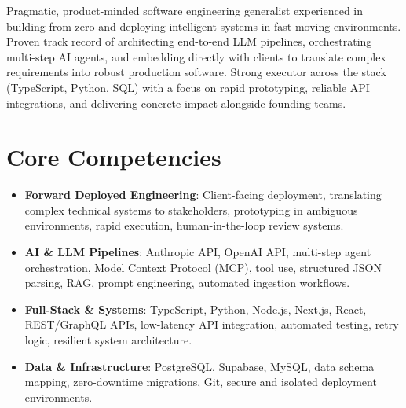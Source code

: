\documentclass[10pt,a4paper,sans]{moderncv}
\begin{document}
\makecvtitle
\vspace{-12pt}

\small{Pragmatic, product-minded software engineering generalist experienced in building from zero and deploying intelligent systems in fast-moving environments. Proven track record of architecting end-to-end LLM pipelines, orchestrating multi-step AI agents, and embedding directly with clients to translate complex requirements into robust production software. Strong executor across the stack (TypeScript, Python, SQL) with a focus on rapid prototyping, reliable API integrations, and delivering concrete impact alongside founding teams.}
\vspace{2pt}

\section{Core Competencies}
\vspace{1pt}
\begin{itemize}
\item \textbf{Forward Deployed Engineering}: Client-facing deployment, translating complex technical systems to stakeholders, prototyping in ambiguous environments, rapid execution, human-in-the-loop review systems.
\item \textbf{AI \& LLM Pipelines}: Anthropic API, OpenAI API, multi-step agent orchestration, Model Context Protocol (MCP), tool use, structured JSON parsing, RAG, prompt engineering, automated ingestion workflows.
\item \textbf{Full-Stack \& Systems}: TypeScript, Python, Node.js, Next.js, React, REST/GraphQL APIs, low-latency API integration, automated testing, retry logic, resilient system architecture.
\item \textbf{Data \& Infrastructure}: PostgreSQL, Supabase, MySQL, data schema mapping, zero-downtime migrations, Git, secure and isolated deployment environments.
\end{itemize}
\vspace{3pt}

\end{document}
